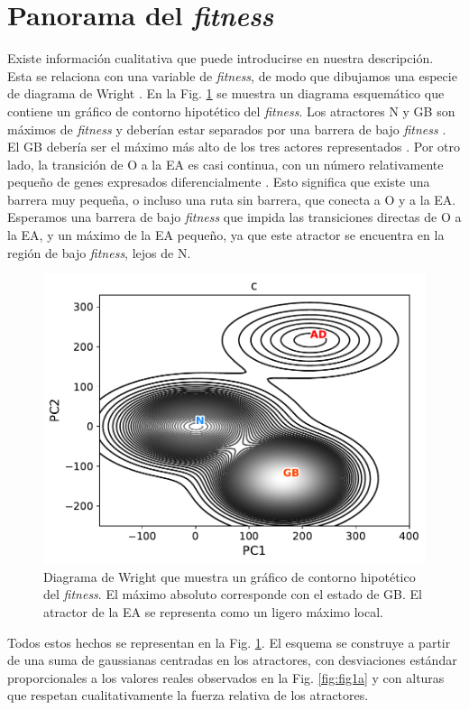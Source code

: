 \section{Panorama del \emph{fitness}}

Existe información cualitativa que puede introducirse en nuestra descripción. Esta se relaciona con una variable de \emph{fitness}, de modo que dibujamos una especie de diagrama de Wright \cite{wright1932roles}. En la Fig. \ref{fig:fig1c} se muestra un diagrama esquemático que contiene un gráfico de contorno hipotético del \emph{fitness}. Los atractores N y GB son máximos de \emph{fitness} y deberían estar separados por una barrera de bajo \emph{fitness} \cite{Gonzalez_2021}. El GB debería ser el máximo más alto de los tres actores representados \cite{Gonzalez_2021, gonzalez2022estimating}. Por otro lado, la transición de O a la EA es casi continua, con un número relativamente pequeño de genes expresados diferencialmente \cite{Gonzalez_2021}. Esto significa que existe una barrera muy pequeña, o incluso una ruta sin barrera, que conecta a O y a la EA. Esperamos una barrera de bajo \emph{fitness} que impida las transiciones directas de O a la EA, y un máximo de la EA pequeño, ya que este atractor se encuentra en la región de bajo \emph{fitness}, lejos de N. 

\begin{figure}[!htb]
	\centering
	\includegraphics[width=0.75\linewidth]{figures/Fig_1c.pdf}
	\caption{Diagrama de Wright que muestra un gráfico de contorno hipotético del \emph{fitness}. El máximo absoluto corresponde con el estado de GB. El atractor de la EA se representa como un ligero máximo local.}
	\label{fig:fig1c}
\end{figure}

Todos estos hechos se representan en la Fig. \ref{fig:fig1c}. El esquema se construye a partir de una suma de gaussianas centradas en los atractores, con desviaciones estándar proporcionales a los valores reales observados en la Fig. \ref{fig:fig1a} y con alturas que respetan cualitativamente la fuerza relativa de los atractores.



